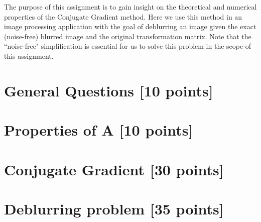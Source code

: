 \documentclass[unicode,11pt,a4paper,oneside,numbers=endperiod,openany]{scrartcl}
\begin{document}
\setassignment
{}

\newline

\assignmentpolicy


The purpose of this assignment is to gain insight on the theoretical and numerical properties of the Conjugate Gradient method. Here we use this method in an image processing application with the goal of deblurring an image given the exact (noise-free) blurred image and the original transformation matrix. Note that the ``noise-free" simplification is essential for us to solve this problem in the scope of this assignment.
\tableofcontents
\clearpage

\section{General Questions [10 points]}

\section{Properties of A [10 points]}

\section{Conjugate Gradient [30 points]}

\section{Deblurring problem [35 points]}
\end{document}
